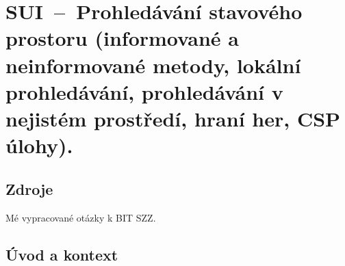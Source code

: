 

\graphicspath{{sui/prohledavani_stavoveho_prostoru/figures}}


\chapter{SUI~--~Prohledávání stavového prostoru (informované a neinformované metody, lokální prohledávání, prohledávání v nejistém prostředí, hraní her, CSP úlohy).}


\section{Zdroje}

\begin{compactitem}
    \item {}
    \item {}
    \item Mé vypracované otázky k BIT SZZ.
\end{compactitem}


\section{Úvod a kontext}

